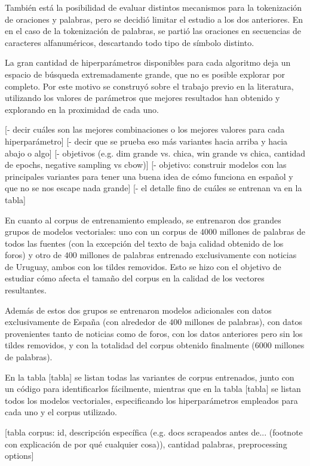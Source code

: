 También está la posibilidad de evaluar distintos mecanismos para la tokenización de oraciones y
palabras, pero se decidió limitar el estudio a los dos anteriores. En en el caso de la tokenización
de palabras, se partió las oraciones en secuencias de caracteres alfanuméricos, descartando todo
tipo de símbolo distinto.


La gran cantidad de hiperparámetros disponibles para cada algoritmo deja un espacio de búsqueda
extremadamente grande, que no es posible explorar por completo. Por este motivo se construyó sobre
el trabajo previo en la literatura, utilizando los valores de parámetros que mejores resultados han
obtenido y explorando en la proximidad de cada uno.

[- decir cuáles son las mejores combinaciones o los mejores valores para cada hiperparámetro]
[- decir que se prueba eso más variantes hacia arriba y hacia abajo o algo]
[- objetivos (e.g. dim grande vs. chica, win grande vs chica, cantidad de epochs, negative sampling vs cbow)]
[- objetivo: construir modelos con las principales variantes para tener una buena idea de cómo funciona en español y que no se nos escape nada grande]
[- el detalle fino de cuáles se entrenan va en la tabla]

En cuanto al corpus de entrenamiento empleado, se entrenaron dos grandes grupos de modelos
vectoriales: uno con un corpus de $4000$ millones de palabras de todos las fuentes (con la excepción
del texto de baja calidad obtenido de los foros) y otro de $400$ millones de palabras entrenado
exclusivamente con noticias de Uruguay, ambos con los tildes removidos. Esto se hizo con el objetivo
de estudiar cómo afecta el tamaño del corpus en la calidad de los vectores resultantes.

Además de estos dos grupos se entrenaron modelos adicionales con datos exclusivamente de España (con
alrededor de $400$ millones de palabras), con datos provenientes tanto de noticias como de foros,
con los datos anteriores pero sin los tildes removidos, y con la totalidad del corpus obtenido
finalmente ($6000$ millones de palabras).

En la tabla [tabla] se listan todas las variantes de corpus entrenados, junto con un código para
identificarlos fácilmente, mientras que en la tabla [tabla] se listan todos los modelos vectoriales,
especificando los hiperparámetros empleados para cada uno y el corpus utilizado.

[tabla corpus: id, descripción específica (e.g. docs scrapeados antes de... (footnote con
explicación de por qué cualquier cosa)), cantidad palabras, preprocessing options]

